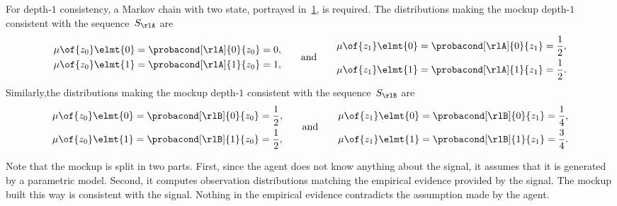 \begin{example}
For depth-\(1\) consistency, a Markov chain with two state, portrayed in~\cref{fig:consistency_two-state_markov_chain}, is required.
The distributions making the mockup depth-\(1\) consistent with the sequence~\(S\param{\rlA}\) are
\[
\begin{aligned}
&\mu \of{z\param{0}} \elmt{0} = \probacond[\rlA]{0}{z\param{0}} = 0, \\
&\mu \of{z\param{0}} \elmt{1} = \probacond[\rlA]{1}{z\param{0}} = 1,
\end{aligned}
\qquad\text{and}\qquad
\begin{aligned}
&\mu \of{z\param{1}} \elmt{0} = \probacond[\rlA]{0}{z\param{1}} = \frac{1}{2}, \\
&\mu \of{z\param{1}} \elmt{1} = \probacond[\rlA]{1}{z\param{1}} = \frac{1}{2}.
\end{aligned}
\]
Similarly,the distributions making the mockup depth-\(1\) consistent with the sequence~\(S\param{\rlB}\) are
\[
\begin{aligned}
&\mu \of{z\param{0}} \elmt{0} = \probacond[\rlB]{0}{z\param{0}} = \frac{1}{2}, \\
&\mu \of{z\param{0}} \elmt{1} = \probacond[\rlB]{1}{z\param{0}} = \frac{1}{2},
\end{aligned}
\qquad\text{and}\qquad
\begin{aligned}
&\mu \of{z\param{1}} \elmt{0} = \probacond[\rlB]{0}{z\param{1}} = \frac{1}{4}, \\
&\mu \of{z\param{1}} \elmt{1} = \probacond[\rlB]{1}{z\param{1}} = \frac{3}{4}.
\end{aligned}
\]

\begin{figure}[htp]
\centering
{}
\label{fig:consistency_two-state_markov_chain}
\end{figure}

Note that the mockup is split in two parts.
First, since the agent does not know anything about the signal, it assumes that it is generated by a parametric model.
Second, it computes observation distributions matching the empirical evidence provided by the signal.
The mockup built this way is consistent with the signal.
Nothing in the empirical evidence contradicts the assumption made by the agent.
\end{example}


